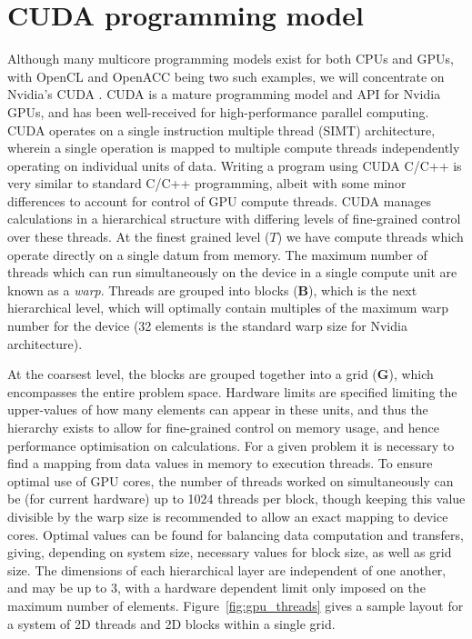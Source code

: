 \section{CUDA programming model}\label{sec:cuda_prog}
Although many multicore programming models exist  for both CPUs and GPUs, with OpenCL and OpenACC being two such examples, we will concentrate on Nvidia's CUDA \cite{NUM:Nickolls_cuda_2008}. CUDA is a mature programming model and API for Nvidia GPUs, and has been well-received for high-performance parallel computing. CUDA operates on a single instruction multiple thread (SIMT) architecture, wherein a single operation is mapped to multiple compute threads independently operating on individual units of data. Writing a program using CUDA C/C++ is very similar to standard C/C++ programming, albeit with some minor differences to account for control of GPU compute threads. CUDA manages calculations in a hierarchical structure with differing levels of fine-grained control over these threads. At the finest grained level ($T$) we have compute threads which operate directly on a single datum from memory. The maximum number of threads which can run simultaneously on the device in a single compute unit are known as a \textit{warp}. Threads are grouped into blocks ($\mathbf{B}$), which is the next hierarchical level, which will optimally contain multiples of the maximum warp number for the device (32 elements is the standard warp size for Nvidia architecture).

At the coarsest level, the blocks are grouped together into a grid ($\mathbf{G}$), which encompasses the entire problem space. Hardware limits are specified limiting the upper-values of how many elements can appear in these units, and thus the hierarchy exists to allow for fine-grained control on memory usage, and hence performance optimisation on calculations. For a given problem it is necessary to find a mapping from data values in memory to execution threads. To ensure optimal use of GPU cores, the number of threads worked on simultaneously can be (for current hardware) up to 1024 threads per block, though keeping this value divisible by the warp size is recommended to allow an exact mapping to device cores. Optimal values can be found for balancing data computation and transfers, giving, depending on system size, necessary values for block size, as well as grid size. The dimensions of each hierarchical layer are independent of one another, and may be up to 3, with a hardware dependent limit only imposed on the maximum number of elements. Figure~\ref{fig:gpu_threads} gives a sample layout for a system of 2D threads and 2D blocks within a single grid.


